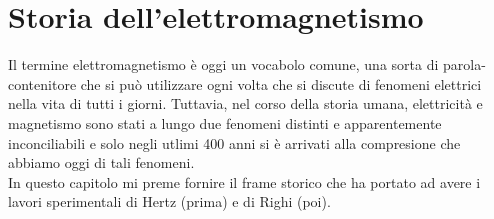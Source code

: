 \chapter{Storia dell'elettromagnetismo}

Il termine elettromagnetismo è oggi un vocabolo comune, una sorta di parola-contenitore che si può utilizzare ogni volta che si discute
di fenomeni elettrici nella vita di tutti i giorni. Tuttavia, nel corso della storia umana, elettricità e magnetismo sono stati a lungo due fenomeni distinti e 
apparentemente inconciliabili e solo negli utlimi 400 anni si è arrivati alla compresione che abbiamo oggi di tali fenomeni.\\
In questo capitolo mi preme fornire il frame storico che ha portato ad avere i lavori sperimentali di Hertz (prima) e di Righi (poi).\\
